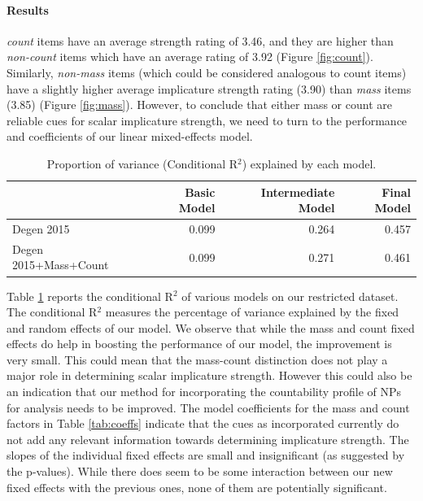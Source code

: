 \documentclass[10pt, biblatex]{report}
\begin{document}
\paragraph{Results} \textit{count} items have
an average strength rating of 3.46, and they are higher than \textit{non-count}
items which have an average rating of 3.92 (Figure \ref{fig:count}). Similarly,
\textit{non-mass} items (which could be considered analogous to count items) have
a slightly higher average implicature strength rating (3.90) than \textit{mass}
items (3.85) (Figure \ref{fig:mass}). However, to conclude that either {\rmsc mass} or {\rmsc count} are
reliable cues for scalar implicature strength, we need to turn to the performance
and coefficients of our linear mixed-effects model.

\begin{table}[t]
    \centering
    \begin{tabular}{lrrr}
         & Basic Model & Intermediate Model & Final Model  \\ \midrule
        Degen 2015 & 0.099 & 0.264 & 0.457 \\
        Degen 2015+Mass+Count & 0.099 & 0.271 & 0.461 \\
    \end{tabular}
    \caption{Proportion of variance (Conditional R$^2$) explained by each model.}
    \label{tab:models}
\end{table}

Table \ref{tab:models}
reports the conditional R$^2$ of various models on our restricted dataset. The
conditional R$^2$ measures the percentage of variance explained by the fixed and
random effects of our model. We observe that while the {\rmsc mass} and {\rmsc
count} fixed effects do help in boosting the performance of our model, the
improvement is very small. This could mean that the mass-count distinction does
not play a major role in determining scalar implicature strength. However this
could also be an indication that our method for incorporating the countability
profile of NPs for analysis needs to be improved. The model coefficients for the
{\rmsc mass} and {\rmsc count} factors in Table \ref{tab:coeffs} indicate that
the cues as incorporated currently do not add any relevant information towards
determining implicature strength. The slopes of the individual fixed effects are
small and insignificant (as suggested by the p-values). While there does seem to
be some interaction between our new fixed effects with the previous ones, none
of them are potentially significant.
\end{document}
